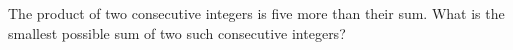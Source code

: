 The product of two consecutive integers is five more than their sum. What is the smallest possible sum of two such consecutive integers?
